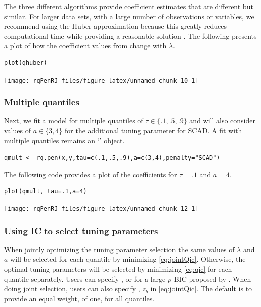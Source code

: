 The three different algorithms provide coefficient estimates that are different but similar. For larger data sets, with a large number of observations or variables, we recommend using the Huber approximation because this greatly reduces computational time while providing a reasonable solution \citep{huber_cd}. The following presents a plot of how the coefficient values from  change with \(\lambda\).

\begin{verbatim}
plot(qhuber)
\end{verbatim}

\begin{center}\texttt{[image: rqPenRJ\_files/figure-latex/unnamed-chunk-10-1]} \end{center}

\subsubsection{Multiple quantiles}\label{multiple-quantiles}

Next, we fit a model for multiple quantiles of \(\tau \in \{.1,.5,.9\}\) and will also consider values of \(a \in \{3,4\}\) for the additional tuning parameter for SCAD. A fit with multiple quantiles remains an `' object.

\begin{verbatim}
qmult <- rq.pen(x,y,tau=c(.1,.5,.9),a=c(3,4),penalty="SCAD")
\end{verbatim}

The following code provides a plot of the coefficients for \(\tau=.1\) and \(a=4\).

\begin{verbatim}
plot(qmult, tau=.1,a=4)
\end{verbatim}

\begin{center}\texttt{[image: rqPenRJ\_files/figure-latex/unnamed-chunk-12-1]} \end{center}

\subsubsection{Using IC to select tuning parameters}\label{using-ic-to-select-tuning-parameters}

When jointly optimizing the tuning parameter selection the same values of \(\lambda\) and \(a\) will be selected for each quantile by minimizing \eqref{eq:jointQic}. Otherwise, the optimal tuning parameters will be selected by minimizing \eqref{eq:qic} for each quantile separately. Users can specify ,  or  for a large \(p\) BIC proposed by \citet{qrbic}. When doing joint selection, users can also specify , \(z_b\) in \eqref{eq:jointQic}. The default is to provide an equal weight, of one, for all quantiles.

